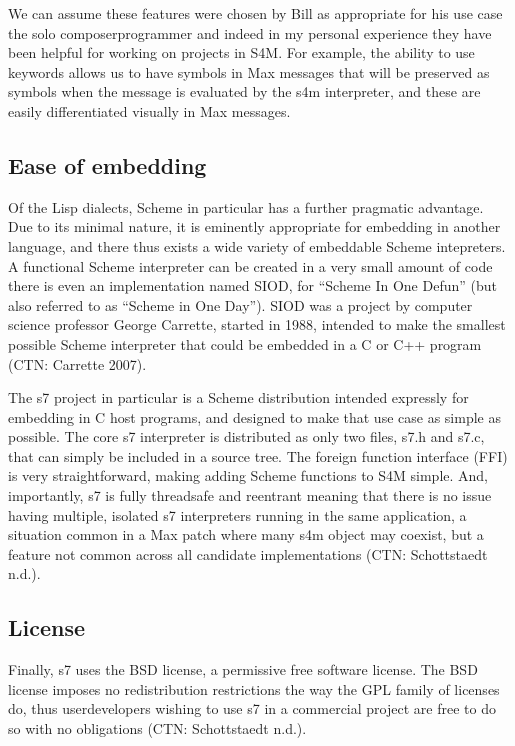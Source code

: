 \documentclass[letterpaper,10pt,english]{sphinxmanual}
\begin{document}
\sphinxAtStartPar
We can assume these features were chosen by Bill as appropriate for his use case \sphinxhyphen{} the solo composer\sphinxhyphen{}programmer \sphinxhyphen{}
and indeed in my personal experience they have been helpful for working on projects in S4M.
For example, the ability to use keywords allows us to have symbols in Max messages that will be preserved
as symbols when the message is evaluated by the s4m interpreter, and these are easily differentiated visually in Max messages.


\subsection{Ease of embedding}
\label{\detokenize{design:ease-of-embedding}}
\sphinxAtStartPar
Of the Lisp dialects, Scheme in particular has a further pragmatic advantage.
Due to its minimal nature, it is eminently appropriate for embedding in another language,
and there thus exists a wide variety of embeddable Scheme intepreters.
A functional Scheme interpreter can be created in a very small amount of code \sphinxhyphen{}
there is even an implementation named SIOD, for “Scheme In One Defun” (but also referred to as “Scheme in One Day”).
SIOD was a project by computer science professor George Carrette, started in 1988, intended to make
the smallest possible Scheme interpreter that could be embedded in a C or C++ program (CTN: Carrette 2007).

\sphinxAtStartPar
The s7 project in particular is a Scheme distribution intended expressly for embedding in C host programs, and
designed to make that use case as simple as possible.
The core s7 interpreter is distributed as only two files, s7.h and s7.c, that can simply be included in a source tree.
The foreign function interface (FFI) is very straightforward, making adding Scheme functions to S4M simple.
And, importantly, s7 is fully thread\sphinxhyphen{}safe and re\sphinxhyphen{}entrant \sphinxhyphen{} meaning that there is no issue having multiple, isolated s7 interpreters
running in the same application, a situation common in a Max patch where many s4m object may coexist, but a feature
not common across all candidate implementations (CTN: Schottstaedt n.d.).


\subsection{License}
\label{\detokenize{design:license}}
\sphinxAtStartPar
Finally, s7 uses the BSD license, a permissive free software license.
The BSD license imposes no redistribution restrictions the way the GPL family of licenses do, thus user\sphinxhyphen{}developers wishing to
use s7 in a commercial project are free to do so with no obligations (CTN: Schottstaedt n.d.).
\end{document}
